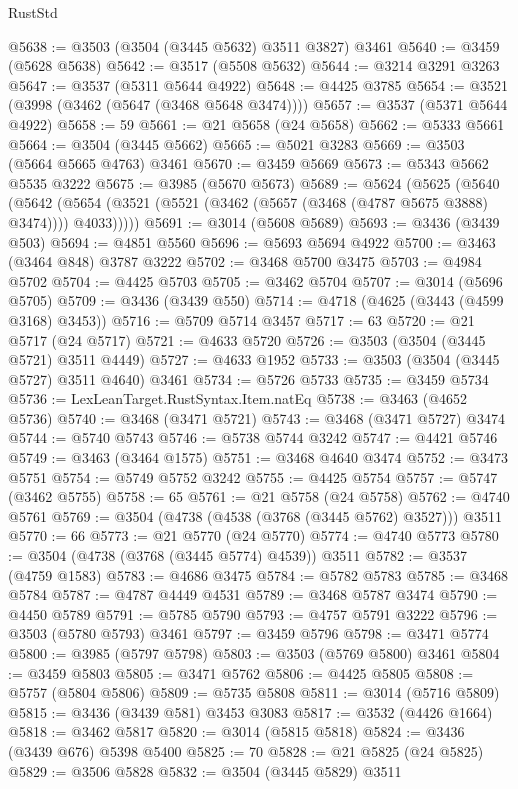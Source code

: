 \begin{lexlean}{RustStd}
\begin{coremodule}
@5638 := @3503 (@3504 (@3445 @5632) @3511 @3827) @3461
@5640 := @3459 (@5628 @5638)
@5642 := @3517 (@5508 @5632)
@5644 := @3214 @3291 @3263
@5647 := @3537 (@5311 @5644 @4922)
@5648 := @4425 @3785
@5654 := @3521 (@3998 (@3462 (@5647 (@3468 @5648 @3474))))
@5657 := @3537 (@5371 @5644 @4922)
@5658 := 59
@5661 := @21 @5658 (@24 @5658)
@5662 := @5333 @5661
@5664 := @3504 (@3445 @5662)
@5665 := @5021 @3283
@5669 := @3503 (@5664 @5665 @4763) @3461
@5670 := @3459 @5669
@5673 := @5343 @5662 @5535 @3222
@5675 := @3985 (@5670 @5673)
@5689 := @5624
    (@5625
      (@5640
        (@5642 (@5654 (@3521 (@5521 (@3462 (@5657 (@3468 (@4787 @5675 @3888) @3474)))) @4033)))))
@5691 := @3014 (@5608 @5689)
@5693 := @3436 (@3439 @503)
@5694 := @4851 @5560
@5696 := @5693 @5694 @4922
@5700 := @3463 (@3464 @848) @3787 @3222
@5702 := @3468 @5700 @3475
@5703 := @4984 @5702
@5704 := @4425 @5703
@5705 := @3462 @5704
@5707 := @3014 (@5696 @5705)
@5709 := @3436 (@3439 @550)
@5714 := @4718 (@4625 (@3443 (@4599 @3168) @3453))
@5716 := @5709 @5714 @3457
@5717 := 63
@5720 := @21 @5717 (@24 @5717)
@5721 := @4633 @5720
@5726 := @3503 (@3504 (@3445 @5721) @3511 @4449)
@5727 := @4633 @1952
@5733 := @3503 (@3504 (@3445 @5727) @3511 @4640) @3461
@5734 := @5726 @5733
@5735 := @3459 @5734
@5736 := LexLeanTarget.RustSyntax.Item.natEq
@5738 := @3463 (@4652 @5736)
@5740 := @3468 (@3471 @5721)
@5743 := @3468 (@3471 @5727) @3474
@5744 := @5740 @5743
@5746 := @5738 @5744 @3242
@5747 := @4421 @5746
@5749 := @3463 (@3464 @1575)
@5751 := @3468 @4640 @3474
@5752 := @3473 @5751
@5754 := @5749 @5752 @3242
@5755 := @4425 @5754
@5757 := @5747 (@3462 @5755)
@5758 := 65
@5761 := @21 @5758 (@24 @5758)
@5762 := @4740 @5761
@5769 := @3504 (@4738 (@4538 (@3768 (@3445 @5762) @3527))) @3511
@5770 := 66
@5773 := @21 @5770 (@24 @5770)
@5774 := @4740 @5773
@5780 := @3504 (@4738 (@3768 (@3445 @5774) @4539)) @3511
@5782 := @3537 (@4759 @1583)
@5783 := @4686 @3475
@5784 := @5782 @5783
@5785 := @3468 @5784
@5787 := @4787 @4449 @4531
@5789 := @3468 @5787 @3474
@5790 := @4450 @5789
@5791 := @5785 @5790
@5793 := @4757 @5791 @3222
@5796 := @3503 (@5780 @5793) @3461
@5797 := @3459 @5796
@5798 := @3471 @5774
@5800 := @3985 (@5797 @5798)
@5803 := @3503 (@5769 @5800) @3461
@5804 := @3459 @5803
@5805 := @3471 @5762
@5806 := @4425 @5805
@5808 := @5757 (@5804 @5806)
@5809 := @5735 @5808
@5811 := @3014 (@5716 @5809)
@5815 := @3436 (@3439 @581) @3453 @3083
@5817 := @3532 (@4426 @1664)
@5818 := @3462 @5817
@5820 := @3014 (@5815 @5818)
@5824 := @3436 (@3439 @676) @5398 @5400
@5825 := 70
@5828 := @21 @5825 (@24 @5825)
@5829 := @3506 @5828
@5832 := @3504 (@3445 @5829) @3511

\end{coremodule}
\end{lexlean}
